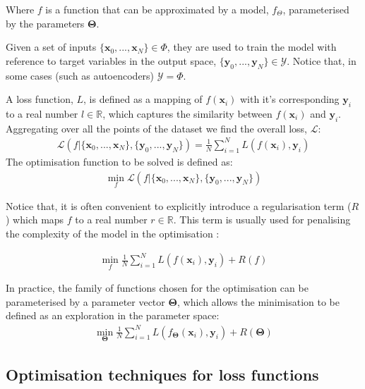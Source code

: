 \documentclass[sn-mathphys-num]{sn-jnl}%
\renewcommand\vec{\mathbf}
\begin{document}
    Where $f$ is a function that can be approximated by a model, $f_\Theta$, parameterised by the parameters $\vec{\Theta}$.
    
    Given a set of inputs $\{\vec{x}_0, ...,\vec{x}_N\} \in \Phi$, they are used to train the model with reference to target variables in the output space, $\{\vec{y}_0, ...,\vec{y}_N\} \in \mathcal{Y}$. Notice that, in some cases (such as autoencoders) $\mathcal{Y} = \Phi$. 
    
    A loss function, $L$, is defined as a mapping of $f(\vec{x}_i)$ with it's corresponding $\vec{y}_i$ to a real number $l\in \mathbb{R}$, which captures the similarity between $f(\vec{x}_i)$ and $\vec{y}_i$. Aggregating over all the points of the dataset we find the overall loss, $\mathcal{L}$:
    \begin{align}
        \mathcal{L}(f |\{\vec{x}_0, ...,\vec{x}_N\},\{\vec{y}_0, ...,\vec{y}_N\} )  = \frac{1}{N} \sum_{i=1}^N L(f(\vec{x}_i),\vec{y}_i)
    \end{align}
    The optimisation function to be solved is defined as:  
    \begin{align}
        \min_{f} \mathcal{L}(f|\{\vec{x}_0, ...,\vec{x}_N\},\{\vec{y}_0, ...,\vec{y}_N\})
    \end{align}
    
    Notice that, it is often convenient to explicitly introduce a regularisation term ($R$) which maps $f$ to a real number $r\in \mathbb{R}$. This term is usually used for penalising the complexity of the model in the optimisation \cite{ML_2}:
    
    \begin{align}
        \min_{f} \frac{1}{N} \sum_{i=1}^N L(f(\vec{x}_i),\vec{y}_i) + R(f)
    \end{align}
    
    In practice, the family of functions chosen for the optimisation can be parameterised by a parameter vector $\vec{\Theta}$, which allows the minimisation to be defined as an exploration in the parameter space:
    \begin{align}\label{loss_regularised}
        \min_{\vec{\Theta}} \frac{1}{N} \sum_{i=1}^N L(f_\vec{\Theta}(\vec{x}_i),\vec{y}_i) + R(\vec{\Theta})
    \end{align}

\subsection{Optimisation techniques for loss functions}
\end{document}
